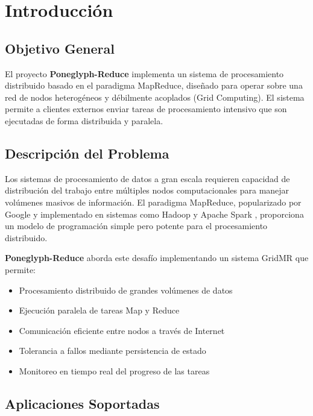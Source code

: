 \section{Introducción}

\subsection{Objetivo General}

El proyecto \textbf{Poneglyph-Reduce} implementa un sistema de procesamiento distribuido basado en el paradigma MapReduce, diseñado para operar sobre una red de nodos heterogéneos y débilmente acoplados (Grid Computing). El sistema permite a clientes externos enviar tareas de procesamiento intensivo que son ejecutadas de forma distribuida y paralela.

\subsection{Descripción del Problema}

Los sistemas de procesamiento de datos a gran escala requieren capacidad de distribución del trabajo entre múltiples nodos computacionales para manejar volúmenes masivos de información. El paradigma MapReduce, popularizado por Google \cite{MapReduceGoogle} y implementado en sistemas como Hadoop y Apache Spark \cite{SparkClusters}, proporciona un modelo de programación simple pero potente para el procesamiento distribuido.

\textbf{Poneglyph-Reduce} aborda este desafío implementando un sistema GridMR que permite:

\begin{itemize}
    \item Procesamiento distribuido de grandes volúmenes de datos
    \item Ejecución paralela de tareas Map y Reduce
    \item Comunicación eficiente entre nodos a través de Internet
    \item Tolerancia a fallos mediante persistencia de estado
    \item Monitoreo en tiempo real del progreso de las tareas
\end{itemize}

\subsection{Aplicaciones Soportadas}

